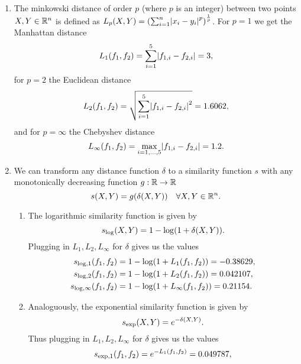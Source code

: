\documentclass[english]{exercise}
\begin{document}
    \begin{enumerate}
        \item The minkowski distance of order \(p\) (where \(p\) is an integer) between two points \(X, Y \in \mathbb{R}^n\) is defined as \(L_p\parentheses*{X, Y} = \parentheses*{\sum_{i = 1}^n \absolute*{x_i - y_i}^p}^{\frac{1}{p}}\).
        For \(p = 1\) we get the Manhattan distance
        \[
            L_1\parentheses*{f_1, f_2} = \sum_{i = 1}^5 \absolute*{f_{1, i} - f_{2, i}} = 3,
        \]
        for \(p = 2\) the Euclidean distance
        \[
            L_2\parentheses*{f_1, f_2} = \sqrt{\sum_{i = 1}^5 \absolute*{f_{1, i} - f_{2, i}}^2} = 1.6062,
        \]
        and for \(p = \infty\) the Chebyshev distance
        \[
            L_\infty\parentheses*{f_1, f_2} = \max_{i = 1, \ldots, 5} \absolute*{f_{1, i} - f_{2, i}} = 1.2.
        \]
        \item We can transform any distance function \(\delta\) to a similarity function \(s\) with any monotonically decreasing function \(g: \mathbb{R} \to \mathbb{R}\)
        \[
            s\parentheses*{X, Y} = g\parentheses*{\delta\parentheses*{X, Y}} \quad \forall X, Y \in \R^n.
        \]
        \begin{enumerate}
            \item The logarithmic similarity function is given by
            \[
                s_{\log}\parentheses*{X, Y} = 1 - \log\parentheses*{1 + \delta\parentheses*{X, Y}}.
            \]
            Plugging in \(L_1, L_2, L_\infty\) for \(\delta\) gives us the values
            \begin{align*}
                s_{\log, 1}\parentheses*{f_1, f_2} &= 1 - \log\parentheses*{1 + L_1\parentheses*{f_1, f_2}} = -0.38629,\\
                s_{\log, 2}\parentheses*{f_1, f_2} &= 1 - \log\parentheses*{1 + L_2\parentheses*{f_1, f_2}} = 0.042107,\\
                s_{\log, \infty}\parentheses*{f_1, f_2} &= 1 - \log\parentheses*{1 + L_\infty\parentheses*{f_1, f_2}} = 0.21154.
            \end{align*}
            \item Analoguously, the exponential similarity function is given by
            \[
                s_{\exp}\parentheses*{X, Y} = e^{-\delta\parentheses*{X, Y}}.
            \]
            Thus plugging in \(L_1, L_2, L_\infty\) for \(\delta\) gives us the values
            \begin{align*}
                s_{\exp, 1}\parentheses*{f_1, f_2} &= e^{-L_1\parentheses*{f_1, f_2}} = 0.049787,\\

\end{align*}
\end{enumerate}
\end{enumerate}
\end{document}
